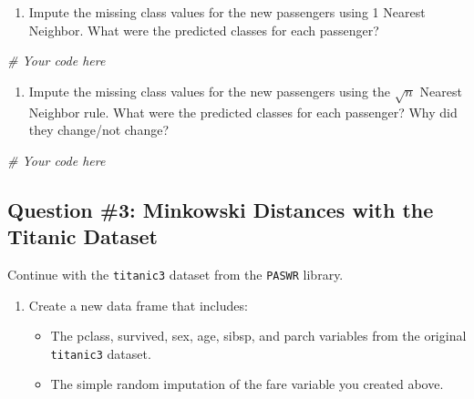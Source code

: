 \documentclass[]{article}
\newenvironment{Shaded}{\begin{snugshade}}{\end{snugshade}}
\newcommand{\CommentTok}[1]{\textcolor[rgb]{0.56,0.35,0.01}{\textit{#1}}}
\providecommand{\tightlist}{%
  \setlength{\itemsep}{0pt}\setlength{\parskip}{0pt}}
\begin{document}
\begin{enumerate}
\def\labelenumi{\arabic{enumi}.}
\setcounter{enumi}{4}
\tightlist
\item
  Impute the missing class values for the new passengers using 1 Nearest
  Neighbor. What were the predicted classes for each passenger?
\end{enumerate}

\begin{Shaded}
\begin{Highlighting}[]
\CommentTok{# Your code here}
\end{Highlighting}
\end{Shaded}

\begin{enumerate}
\def\labelenumi{\arabic{enumi}.}
\setcounter{enumi}{5}
\tightlist
\item
  Impute the missing class values for the new passengers using the
  \(\sqrt{n}\) Nearest Neighbor rule. What were the predicted classes
  for each passenger? Why did they change/not change?
\end{enumerate}

\begin{Shaded}
\begin{Highlighting}[]
\CommentTok{# Your code here}
\end{Highlighting}
\end{Shaded}

\subsection{Question \#3: Minkowski Distances with the Titanic
Dataset}\label{question-3-minkowski-distances-with-the-titanic-dataset}

Continue with the \texttt{titanic3} dataset from the \texttt{PASWR}
library.

\begin{enumerate}
\def\labelenumi{\arabic{enumi}.}
\tightlist
\item
  Create a new data frame that includes:

  \begin{itemize}
  \tightlist
  \item
    The pclass, survived, sex, age, sibsp, and parch variables from the
    original \texttt{titanic3} dataset.
  \item
    The simple random imputation of the fare variable you created above.
  \end{itemize}
\end{enumerate}
\end{document}
